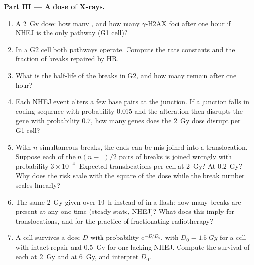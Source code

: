 \begin{problem}
\medskip
\noindent\textbf{Part III --- A dose of X-rays.}
\begin{enumerate}[resume]
  \item A \qty{2}{Gy} dose: how many , and how many
        $\gamma$-H2AX foci after one hour if NHEJ is the only pathway
        (G1 cell)?
  \item In a G2 cell both pathways operate. Compute the rate constants
        and the fraction of breaks repaired by HR.
  \item What is the half-life of the breaks in G2, and how many remain
        after one hour?
  \item Each NHEJ event alters a few base pairs at the junction. If a
        junction falls in coding sequence with probability $0.015$ and
        the alteration then disrupts the gene with probability $0.7$,
        how many genes does the \qty{2}{Gy} dose disrupt per G1 cell?
  \item With $n$ simultaneous breaks, the ends can be mis-joined into
        a translocation. Suppose each of the $n(n-1)/2$ pairs of breaks
        is joined wrongly with probability $3\times 10^{-4}$. Expected
        translocations per cell at \qty{2}{Gy}? At \qty{0.2}{Gy}? Why
        does the risk scale with the square of the dose while the break
        number scales linearly?
  \item The same \qty{2}{Gy} given over \qty{10}{h} instead of in a
        flash: how many breaks are present at any one time (steady
        state, NHEJ)? What does this imply for translocations, and for
        the practice of fractionating radiotherapy?
  \item A cell survives a dose $D$ with probability $e^{-D/D_{0}}$, with
        $D_{0} = \qty{1.5}{Gy}$ for a cell with intact repair and
        \qty{0.5}{Gy} for one lacking NHEJ. Compute the survival of
        each at \qty{2}{Gy} and at \qty{6}{Gy}, and interpret $D_{0}$.
\end{enumerate}


\end{problem}
